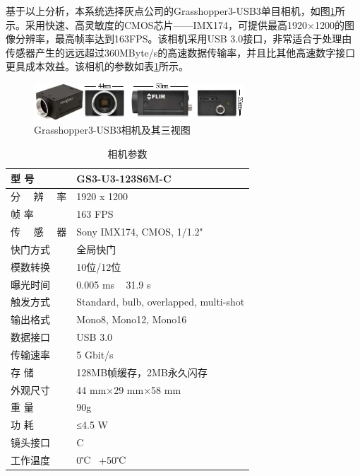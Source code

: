 基于以上分析，本系统选择灰点公司的Grasshopper3-USB3单目相机，如图\ref{fig2_8}所示。采用快速、高灵敏度的CMOS芯片——IMX174，可提供最高1920×1200的图像分辨率，最高帧率达到163FPS。该相机采用USB 3.0接口，非常适合于处理由传感器产生的远远超过360MByte/s的高速数据传输率，并且比其他高速数字接口更具成本效益。该相机的参数如表\ref{tab2.1}所示。
\begin{figure}[h]\setlength{\belowcaptionskip}{8pt}
	\centering
	\includegraphics[width=0.7\textwidth]{figures/chapter2/fig2_8}
	\caption{Grasshopper3-USB3相机及其三视图}\label{fig2_8}
\end{figure}
\begin{table}\setlength{\belowcaptionskip}{-12pt}
	\centering
	\caption{相机参数} \label{tab2.1}
	\begin{tabular}{m{}<{\centering} m{}<{\centering}}%
		\toprule
		型 \quad\quad 号			&GS3-U3-123S6M-C	 \\
		 \midrule
		分 \ \  辨 \ \  率	       &1920 x 1200         \\
		 \midrule
		帧 \quad\quad 率	    	&163 FPS	         \\
		 \midrule
		传 \ \  感 \ \  器	   &Sony IMX174, CMOS, 1/1.2"	 \\
		 \midrule
		快门方式	              &全局快门             \\
		\midrule
		模数转换                  &10位/12位           \\
		\midrule
		曝光时间                  &0.005 ms ~ 31.9 s   \\
		\midrule
		触发方式                  &Standard, bulb, overlapped, multi-shot \\
		\midrule
		输出格式                  &Mono8, Mono12, Mono16\\
		\midrule
		数据接口                  &USB 3.0                \\
		\midrule
		传输速率                  &5 Gbit/s                \\
		\midrule
		存 \quad\quad 储          &128MB帧缓存，2MB永久闪存    \\
		\midrule
		外观尺寸                  &44 mm×29 mm×58 mm        \\
		\midrule
		重 \quad\quad 量          &90g                    \\
		\midrule
		功 \quad\quad 耗          &≤4.5 W                 \\
		\midrule
		镜头接口                  &C                      \\
		\midrule
		工作温度 	              &0℃~ +50℃               \\
		\bottomrule
	\end{tabular}
\end{table}

